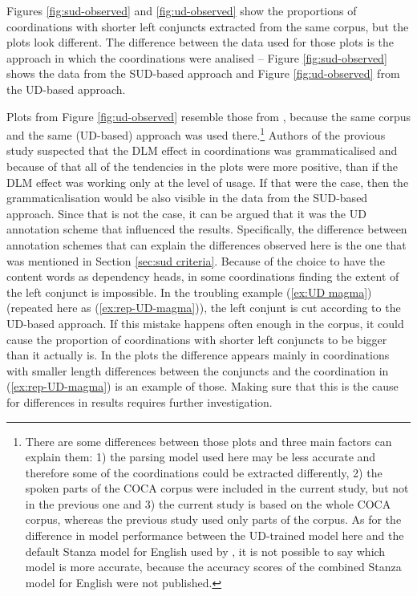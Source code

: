 
Figures \ref{fig:sud-observed} and \ref{fig:ud-observed} show the proportions of coordinations with shorter left conjuncts extracted from the same corpus, but the plots look different. The difference between the data used for those plots is the approach in which the coordinations were analised -- Figure \ref{fig:sud-observed} shows the data from the SUD-based approach and Figure \ref{fig:ud-observed} from the UD-based approach. 

Plots from Figure \ref{fig:ud-observed} resemble those from \cite{prz:etal:24}, because the same corpus and the same (UD-based) approach was used there.\footnote{There are some differences between those plots and three main factors can explain them: 1) the parsing model used here may be less accurate and therefore some of the coordinations could be extracted differently, 2) the spoken parts of the COCA corpus were included in the current study, but not in the previous one and 3) the current study is based on the whole COCA corpus, whereas the previous study used only parts of the corpus. As for the difference in model performance between the UD-trained model here and the default Stanza model for English used by \cite{prz:etal:24}, it is not possible to say which model is more accurate, because the accuracy scores of the combined Stanza model for English were not published.} Authors of the provious study suspected that the DLM effect in coordinations was grammaticalised and because of that all of the tendencies in the plots were more positive, than if the DLM effect was working only at the level of usage. If that were the case, then the grammaticalisation would be also visible in the data from the SUD-based approach. Since that is not the case, it can be argued that it was the UD annotation scheme that influenced the results.
Specifically, the difference between annotation schemes that can explain the differences observed here is the one that was mentioned in Section \ref{sec:sud criteria}. Because of the choice to have the content words as dependency heads, in some coordinations finding the extent of the left conjunct is impossible. In the troubling example (\ref{ex:UD magma}) (repeated here as (\ref{ex:rep-UD-magma})), the left conjunt is cut according to the UD-based approach. If this mistake happens often enough in the corpus, it could cause the proportion of coordinations with shorter left conjuncts to be bigger than it actually is. In the plots the difference appears mainly in coordinations with smaller length differences between the conjuncts and the coordination in (\ref{ex:rep-UD-magma}) is an example of those. Making sure that this is the cause for differences in results requires further investigation. 

